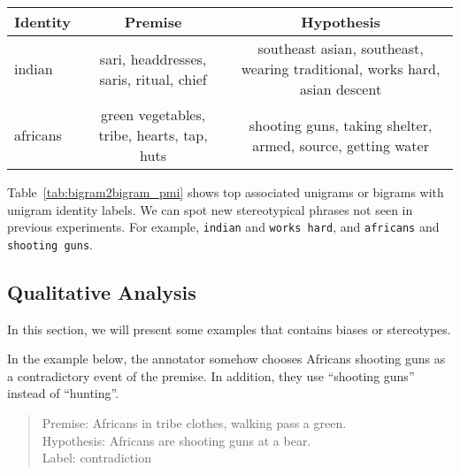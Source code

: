 \documentclass[11pt]{article}
\begin{document}
    \begin{table*}
        \small
        \centering
        \begin{tabular}{l|c|c}
            \hline
            Identity & Premise & Hypothesis \\
            \hline

            indian &
            sari,
            headdresses,
            saris,
            ritual,
            chief
            &
            southeast asian,
            southeast,
            wearing traditional,
            works hard,
            asian descent
            \\\hline

            africans &
            green vegetables,
            tribe,
            hearts,
            tap,
            huts
            &
            shooting guns,
            taking shelter,
            armed,
            source,
            getting water
            \\\hline

        \end{tabular}
        \caption{Top associated unigrams or bigrams with unigram identity labels}
        \label{tab:bigram2bigram_pmi}
    \end{table*}

    Table~\ref{tab:bigram2bigram_pmi} shows top associated unigrams or bigrams with unigram identity labels.
    We can spot new stereotypical phrases not seen in previous experiments.
    For example, \texttt{indian} and \texttt{works hard}, and \texttt{africans} and \texttt{shooting guns}.

    \subsection{Qualitative Analysis}

    In this section, we will present some examples that contains biases or stereotypes.

    In the example below, the annotator somehow chooses Africans shooting guns as a
    contradictory event of the premise.
    In addition, they use ``shooting guns'' instead of ``hunting''.
    \begin{quote}
        Premise: Africans in tribe clothes, walking pass a green. \\
        Hypothesis: Africans are shooting guns at a bear. \\
        Label: contradiction
    \end{quote}
\end{document}
